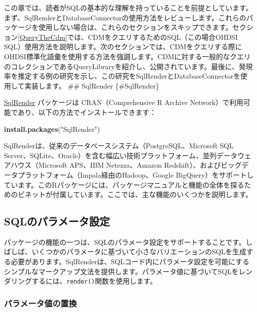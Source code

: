 \documentclass[
  11pt]{book}
\newenvironment{Shaded}{\begin{snugshade}}{\end{snugshade}}
\newcommand{\FunctionTok}[1]{\textcolor[rgb]{0.13,0.29,0.53}{\textbf{#1}}}
\newcommand{\NormalTok}[1]{#1}
\newcommand{\StringTok}[1]{\textcolor[rgb]{0.31,0.60,0.02}{#1}}
\theoremstyle{definition}
\theoremstyle{definition}
\theoremstyle{definition}
\theoremstyle{definition}
\theoremstyle{remark}
\begin{document}
この章では、読者がSQLの基本的な理解を持っていることを前提としています。まず、SqlRenderとDatabaseConnectorの使用方法をレビューします。これらのパッケージを使用しない場合は、これらのセクションをスキップできます。セクション\ref{QueryTheCdm}では、CDMをクエリするためのSQL（この場合OHDSI SQL）使用方法を説明します。次のセクションでは、CDMをクエリする際にOHDSI標準化語彙を使用する方法を強調します。CDMに対する一般的なクエリのコレクションであるQueryLibraryを紹介し、公開されています。最後に、発現率を推定する例の研究を示し、この研究をSqlRenderとDatabaseConnectorを使用して実装します。  
\#\# SqlRender \{\#SqlRender\}

\href{https://ohdsi.github.io/SqlRender/}{SqlRender} パッケージは CRAN（Comprehensive R Archive Network）で利用可能であり、以下の方法でインストールできます：

\begin{Shaded}
\begin{Highlighting}[]
\FunctionTok{install.packages}\NormalTok{(}\StringTok{"SqlRender"}\NormalTok{)}
\end{Highlighting}
\end{Shaded}

SqlRenderは、従来のデータベースシステム（PostgreSQL、Microsoft SQL Server、SQLite、Oracle）を含む幅広い技術プラットフォーム、並列データウェアハウス（Microsoft APS、IBM Netezza、Amazon Redshift）、およびビッグデータプラットフォーム（Impala経由のHadoop、Google BigQuery）をサポートしています。このRパッケージには、パッケージマニュアルと機能の全体を探るためのビネットが付属しています。ここでは、主な機能のいくつかを説明します。

\subsection{SQLのパラメータ設定}\label{sqlux306eux30d1ux30e9ux30e1ux30fcux30bfux8a2dux5b9a}

パッケージの機能の一つは、SQLのパラメータ設定をサポートすることです。しばしば、いくつかのパラメータに基づいて小さなバリエーションのSQLを生成する必要があります。SqlRenderは、SQLコード内にパラメータ設定を可能にするシンプルなマークアップ文法を提供します。パラメータ値に基づいてSQLをレンダリングするには、\texttt{render()}関数を使用します。 

\subsubsection*{パラメータ値の置換}\label{ux30d1ux30e9ux30e1ux30fcux30bfux5024ux306eux7f6eux63db}
\end{document}
